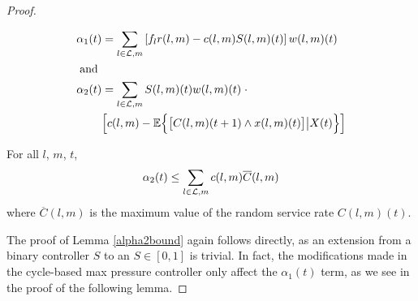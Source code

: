 \begin{proof}
\begin{small}
\begin{align}
\alpha_1 (t) &=  \sum_{l \in \mathcal{L},m} \left[ f_l r(l,m) - c(l,m)S(l,m)(t) \right] w(l,m)(t)   \\
\nonumber \text{ and }&  \\  \nonumber
 \alpha_2 (t) & =  \sum_{l \in \mathcal{L},m}S(l,m)(t)w(l,m)(t)  \; \cdot   \\ 
&\Big[ c(l,m)- \mathbb{E}\Big\{  \big[C  (l,m)(t+1)\wedge x(l,m)(t)\big] \big| X(t)  \Big\}  \Big]  
\end{align}
\end{small}
\begin{Lem} \label{alpha2bound}
For all $l$, $m$, $t$, 
\begin{equation} 
\alpha_2 (t) \leq \sum_{l \in \mathcal{L},m} c(l,m)\overline{C} (l,m)
\end{equation}
where $\overline{C} (l,m)$ is the maximum value of the random service rate $C(l,m)(t)$. 
\end{Lem}
The proof of Lemma \ref{alpha2bound} again follows \cite{MaxPressureStochastic} directly, as an extension from a binary controller $S$ to an $S\in [0,1]$ is trivial. In fact, the modifications made in the cycle-based max pressure controller only affect the $\alpha_1 (t)$ term, as we see in the proof of the following lemma. 


\end{proof}
